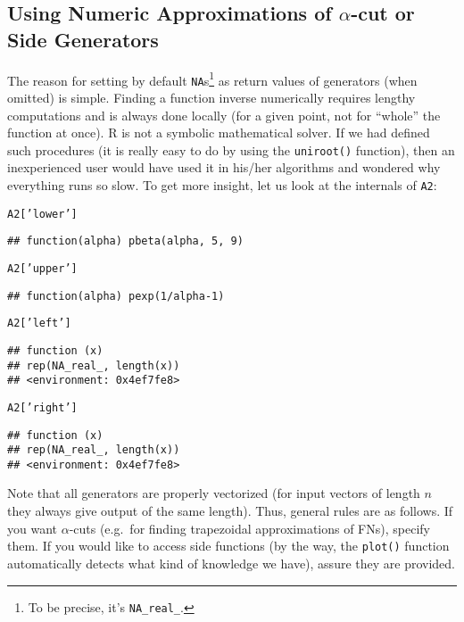 \documentclass[11pt]{article}\usepackage{graphicx, color}
\makeatletter
\newcommand{\hlstring}[1]{\textcolor[rgb]{0.6,0.6,1}{#1}}%
\newenvironment{kframe}{%
 \def\at@end@of@kframe{}%
 \ifinner\ifhmode%
  \def\at@end@of@kframe{\end{minipage}}%
  \begin{minipage}{\columnwidth}%
 \fi\fi%
 \def\FrameCommand##1{\hskip\@totalleftmargin \hskip-\fboxsep
 \colorbox{shadecolor}{##1}\hskip-\fboxsep
     \hskip-\linewidth \hskip-\@totalleftmargin \hskip\columnwidth}%
 \MakeFramed {\advance\hsize-\width
   \@totalleftmargin\z@ \linewidth\hsize
   \@setminipage}}%
 {\par\unskip\endMakeFramed%
 \at@end@of@kframe}
\newenvironment{knitrout}{}{} %
\newcommand{\lang}[1]{\textsf{#1}\xspace}
\newcommand{\R}{\lang{R}}
\makeatother
\begin{document}
\subsection{Using Numeric Approximations of $\alpha$-cut or Side Generators}

The reason for setting  by default
\texttt{NA}s\footnote{To be precise, it's \texttt{NA\_real\_}.}
as return values of generators
(when omitted) is simple. Finding a function inverse numerically
requires lengthy computations and is always done locally
(for a given point, not for ``whole'' the function at once).
\R is not a symbolic mathematical solver.
If we had defined such procedures (it is really easy to do
by using the \texttt{uniroot()} function), then an inexperienced user
would have used it in his/her algorithms and wondered why everything
runs so slow. To get more insight, let us look at the internals of \texttt{A2}:

\begin{knitrout}\small
{}\color{fgcolor}\begin{kframe}
\begin{alltt}
A2[\hlstring{'lower'}]
\end{alltt}
\begin{verbatim}
## function(alpha) pbeta(alpha, 5, 9)
\end{verbatim}
\begin{alltt}
A2[\hlstring{'upper'}]
\end{alltt}
\begin{verbatim}
## function(alpha) pexp(1/alpha-1)
\end{verbatim}
\begin{alltt}
A2[\hlstring{'left'}]
\end{alltt}
\begin{verbatim}
## function (x) 
## rep(NA_real_, length(x))
## <environment: 0x4ef7fe8>
\end{verbatim}
\begin{alltt}
A2[\hlstring{'right'}]
\end{alltt}
\begin{verbatim}
## function (x) 
## rep(NA_real_, length(x))
## <environment: 0x4ef7fe8>
\end{verbatim}
\end{kframe}
\end{knitrout}


\noindent
Note that all generators are properly vectorized (for
input vectors of length $n$ they always give output of the
same length).
Thus, general rules are as follows.
If you want $\alpha$-cuts (e.g.~for finding
trapezoidal approximations of FNs), specify them.
If you would like to access side functions (by the way,
the \texttt{plot()} function
automatically detects what kind of knowledge we have),
assure they are provided.
\end{document}
